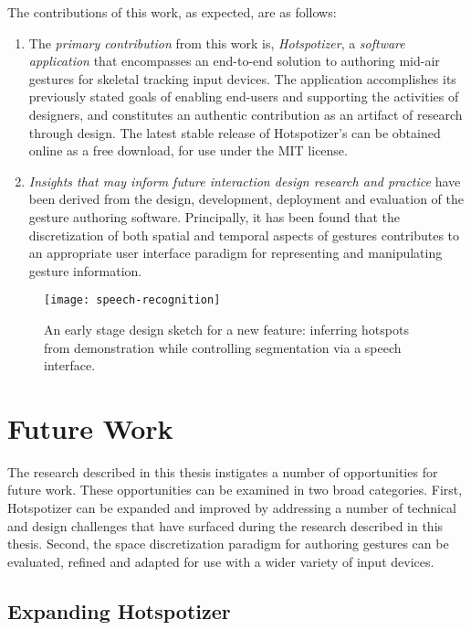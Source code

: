 The contributions of this work, as expected, are as follows:

\begin{enumerate}
\item The \emph{primary contribution} from this work is, \emph{Hotspotizer}, a \emph{software application} that encompasses an end-to-end solution to authoring mid-air gestures for skeletal tracking input devices. The application accomplishes its previously stated goals of enabling end-users and supporting the activities of designers, and constitutes an authentic contribution as an artifact of research through design. The latest stable release of Hotspotizer's can be obtained online as a free download, for use under the MIT license.
\item \emph{Insights that may inform future interaction design research and practice} have been derived from the design, development, deployment and evaluation of the gesture authoring software. Principally, it has been found that the discretization of both spatial and temporal aspects of gestures contributes to an appropriate user interface paradigm for representing and manipulating gesture information.
\end{enumerate}

\begin{SCfigure}[\sidecaptionrelwidth][t]
\centering
\texttt{[image: speech-recognition]}
\caption{An early stage design sketch for a new feature: inferring hotspots from demonstration while controlling segmentation via a speech interface.}
\label{fig:speech-recognition}
\end{SCfigure}

\section{Future Work}
\label{sec:future-work}

The research described in this thesis instigates a number of opportunities for future work. These opportunities can be examined in two broad categories. First, Hotspotizer can be expanded and improved by addressing a number of technical and design challenges that have surfaced during the research described in this thesis. Second, the space discretization paradigm for authoring gestures can be evaluated, refined and adapted for use with a wider variety of input devices.

\subsection{Expanding Hotspotizer}

